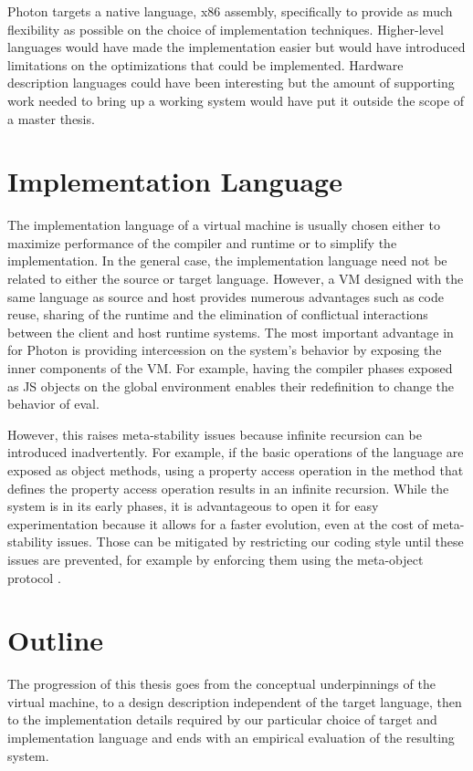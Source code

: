 Photon targets a native language, x86 assembly, specifically to provide as much
flexibility as possible on the choice of implementation techniques.
Higher-level languages would have made the implementation easier but would have
introduced limitations on the optimizations that could be implemented.
Hardware description languages could have been interesting but the amount of
supporting work needed to bring up a working system would have put it outside
the scope of a master thesis.

\section{Implementation Language}

The implementation language of a virtual machine is usually chosen either to
maximize performance of the compiler and runtime or to simplify the
implementation. In the general case, the implementation language need not be
related to either the source or target language. However, a VM designed with
the same language as source and host provides numerous advantages such as code
reuse, sharing of the runtime and the elimination of conflictual interactions
between the client and host runtime systems. The most important advantage in
for Photon is providing intercession on the system’s behavior by exposing the
inner components of the VM. For example, having the compiler phases exposed as
JS objects on the global environment enables their redefinition to change the
behavior of eval. 

However, this raises meta-stability issues because infinite recursion can be
introduced inadvertently. For example, if the basic operations of the
language are exposed as object methods, using a property access operation in
the method that defines the property access operation results in an infinite
recursion. While the system is in its early phases, it is advantageous to open
it for easy experimentation because it allows for a faster evolution, even at
the cost of meta-stability issues. Those can be mitigated by restricting our
coding style until these issues are prevented, for example by enforcing them
using the meta-object protocol \cite{Kiczales:1991}.

\section{Outline}

The progression of this thesis goes from the conceptual underpinnings of the
virtual machine, to a design description independent of the target
language, then to the implementation details required by our particular choice
of target and implementation language and ends with an empirical evaluation of
the resulting system.

